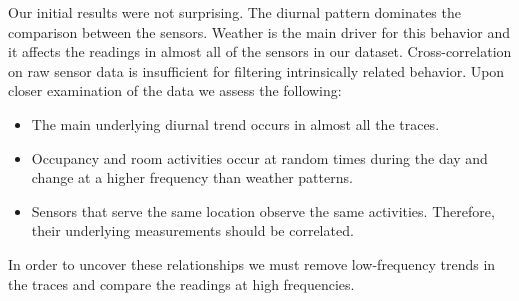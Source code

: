
Our initial results were not surprising.  The diurnal pattern dominates the comparison between the sensors.
Weather is the main driver for this behavior and it affects the readings in almost all of the
sensors in our dataset.  Cross-correlation on raw sensor data is insufficient for filtering intrinsically related
behavior.  Upon closer examination of the data we assess the following:

\begin{itemize}
\item The main underlying diurnal trend occurs in almost all the traces.
\item Occupancy and room activities occur at random times during the day and change 
		at a higher frequency than weather patterns.
\item Sensors that serve the same location observe the same activities.  Therefore, their underlying
		measurements should be correlated.
\end{itemize}

In order to uncover these relationships we must remove low-frequency trends in the traces and
compare the readings at high frequencies.



